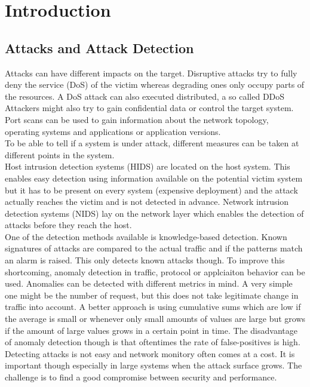 
\section{Introduction}

\subsection{Attacks and Attack Detection}
Attacks can have different impacts on the target.
Disruptive attacks try to fully deny the service (DoS) of the victim whereas degrading ones only occupy parts of the resources.
A DoS attack can also executed distributed, a so called DDoS
Attackers might also try to gain confidential data or control the target system.
Port scans can be used to gain information about the network topology, operating systems and applications or application versions.\\

To be able to tell if a system is under attack, different measures can be taken at different points in the system.\\
Host intrusion detection systems (HIDS) are located on the host system.
This enables easy detection using information available on the potential victim system but it has to be present on every system (expensive deployment) and the attack actually reaches the victim and is not detected in advance.
Network intrusion detection systems (NIDS) lay on the network layer which enables the detection of attacks before they reach the host.\\
One of the detection methods available is knowledge-based detection.
Known signatures of attacks are compared to the actual traffic and if the patterns match an alarm is raised.
This only detects known attacks though.
To improve this shortcoming, anomaly detection in traffic, protocol or applciaiton behavior can be used.
Anomalies can be detected with different metrics in mind.
A very simple one might be the number of request, but this does not take legitimate change in traffic into account.
A better approach is using cumulative sums which are low if the average is small or whenever only small amounts of values are large but grows if the amount of large values grows in a certain point in time.
The disadvantage of anomaly detection though is that oftentimes the rate of false-positives is high.\\
Detecting attacks is not easy and network monitory often comes at a cost.
It is important though especially in large systems when the attack surface grows.
The challenge is to find a good compromise between security and performance.

